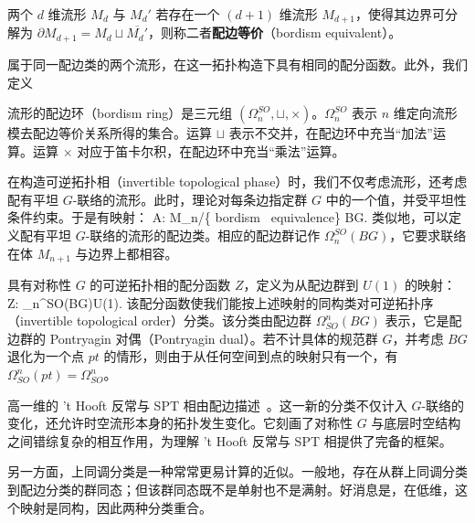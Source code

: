 \begin{definition}
两个 $d$ 维流形 $M_d$ 与 $M_d'$ 若存在一个 $(d+1)$ 维流形 $M_{d+1}$，使得其边界可分解为 $\partial M_{d+1} = M_d \sqcup \overline{M_d'}$，则称二者\textbf{配边等价}（bordism equivalent）。
\end{definition}

属于同一配边类的两个流形，在这一拓扑构造下具有相同的配分函数。此外，我们定义

\begin{definition}
流形的配边环（bordism ring）是三元组 $(\Omega_n^{SO},\sqcup,\times)$。$\Omega_n^{SO}$ 表示 $n$ 维定向流形模去配边等价关系所得的集合。运算 $\sqcup$ 表示不交并，在配边环中充当“加法”运算。运算 $\times$ 对应于笛卡尔积，在配边环中充当“乘法”运算。
\end{definition}

在构造可逆拓扑相（invertible topological phase）时，我们不仅考虑流形，还考虑配有平坦 $G$-联络的流形。此时，理论对每条边指定群 $G$ 中的一个值，并受平坦性条件约束。于是有映射：
\be  A: M_n/{\rm \{ bordism \ equivalence\} } \to BG.   \ee
类似地，可以定义配有平坦 $G$-联络的流形的配边类。相应的配边群记作 $\Omega_n^{SO}(BG)$，它要求联络在体 $M_{n+1}$ 与边界上都相容。

具有对称性 $G$ 的可逆拓扑相的配分函数 $Z$，定义为从配边群到 $U(1)$ 的映射：
\be\label{eq:cobor}  Z: \Omega_n^{SO}(BG)\rightarrow U(1).   \ee
该配分函数使我们能按上述映射的同构类对可逆拓扑序（invertible topological order）分类。该分类由配边群 $\Omega^n_{SO}(BG)$ 表示，它是配边群的 Pontryagin 对偶（Pontryagin dual）。若不计具体的规范群 $G$，并考虑 $BG$ 退化为一个点 $pt$ 的情形，则由于从任何空间到点的映射只有一个，有 $\Omega^n_{SO}(pt) = \Omega^n_{SO}$。

高一维的 't Hooft 反常与 SPT 相由配边描述~\cite{Kapustin:2014tfa,Kapustin:2014dxa,kapustin2014symmetry,freed2014shortrange,brumfiel2016pontrjagin,campbell2017homotopy,brumfiel2018pontrjagin,Wan:2018bns,Wan:2019soo,yonekura2019cobordism,freed2021reflection}。这一新的分类不仅计入 $G$-联络的变化，还允许时空流形本身的拓扑发生变化。它刻画了对称性 $G$ 与底层时空结构之间错综复杂的相互作用，为理解 't Hooft 反常与 SPT 相提供了完备的框架。

另一方面，上同调分类是一种常常更易计算的近似。一般地，存在从群上同调分类到配边分类的群同态；但该群同态既不是单射也不是满射。好消息是，在低维，这个映射是同构，因此两种分类重合。

